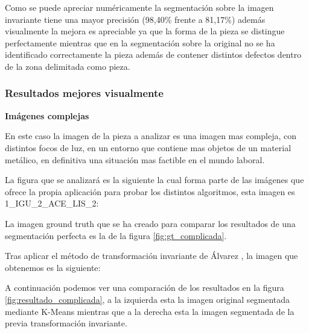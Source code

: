 
Como se puede apreciar numéricamente la segmentación sobre la imagen invariante tiene una mayor precisión (98,40\% frente a 81,17\%) además visualmente la mejora es apreciable ya que la forma de la pieza se distingue perfectamente mientras que en la segmentación sobre la original no se ha identificado correctamente la pieza además de contener distintos defectos dentro de la zona delimitada como pieza.

\subsubsection{Resultados mejores visualmente}\label{resultados-mejores-visualmente}

\textbf{Imágenes complejas}

En este caso la imagen de la pieza a analizar es una imagen mas compleja, con distintos focos de luz, en un entorno que contiene mas objetos de un material metálico, en definitiva una situación mas factible en el mundo laboral.

La figura que se analizará es la siguiente la cual forma parte de las imágenes que ofrece la propia aplicación para probar los distintos algoritmos, esta imagen es 1\_IGU\_2\_ACE\_LIS\_2:


La imagen ground truth que se ha creado para comparar los resultados de una segmentación perfecta es la de la figura \ref{fig:gt_complicada}.


Tras aplicar el método de transformación invariante de Álvarez \cite{alvarez2011}, la imagen que obtenemos es la siguiente:


A continuación podemos ver una comparación de los resultados en la figura \ref{fig:resultado_complicada}, a la izquierda esta la imagen original segmentada mediante K-Means mientras que a la derecha esta la imagen segmentada de la previa transformación invariante.


